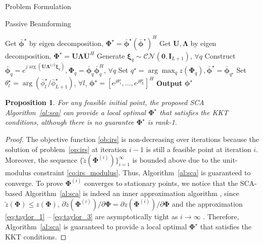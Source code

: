 \documentclass[journal]{IEEEtran}
\newtheorem{proposition}{Proposition}
\begin{document}
\begin{section}{Problem Formulation}
\begin{subsection}{Passive Beamforming}
\begin{algorithm}[!t]
\begin{algorithmic}[1]
						\State Get $\bar{\boldsymbol{\phi}}^\star$ by eigen decomposition, $\boldsymbol{\Phi}^{\star}=\bar{\boldsymbol{\phi}}^\star(\bar{\boldsymbol{\phi}}^\star)^H$
					\Else
						\State Get $\boldsymbol{U},\boldsymbol{\Lambda}$ by eigen decomposition, $\boldsymbol{\Phi}^{\star}=\boldsymbol{U}\boldsymbol{\Lambda}\boldsymbol{U}^H$
						\State Generate $\boldsymbol{\xi}_q \sim \mathcal{CN}(\boldsymbol{0},\boldsymbol{I}_{L+1})$, $\forall q$
						\State Construct $\bar{\boldsymbol{\phi}}_q=e^{j\arg\left(\boldsymbol{U}\boldsymbol{\Lambda}^{1/2}\boldsymbol{\xi}_q\right)},\boldsymbol{\Phi}_q=\bar{\boldsymbol{\phi}}_q\bar{\boldsymbol{\phi}}_q^H$, $\forall q$
						\State Set $q^{\star}=\arg\max_q{z(\boldsymbol{\Phi}_q)},\bar{\boldsymbol{\phi}}^\star=\bar{\boldsymbol{\phi}}_{q^{\star}}$
					\EndIf
					\State Set $\theta_l^\star=\arg(\bar{\phi}_l^\star/\bar{\phi}_{L+1}^\star)$, $\forall l$, $\boldsymbol{\phi}^{\star}=[e^{j\theta_1^\star},\dots,e^{j\theta_L^\star}]^H$
					\State \textbf{Output} $\boldsymbol{\phi}^{\star}$
				\end{algorithmic}
			\end{algorithm}

			\begin{proposition}\label{pr:sca}
				For any feasible initial point, the proposed SCA Algorithm~\ref{al:sca} can provide a local optimal $\boldsymbol{\Phi}^{\star}$ that satisfies the KKT conditions, although there is no guarantee $\boldsymbol{\Phi}^{\star}$ is rank-\num{1}.
			\end{proposition}

			\begin{proof}\label{pf:sca}
				The objective function \eqref{ob:irs} is non-decreasing over iterations because the solution of problem~\eqref{op:irs} at iteration $i-1$ is still a feasible point at iteration $i$. Moreover, the sequence $\{\tilde{z}(\boldsymbol{\Phi}^{(i)})\}_{i=1}^{\infty}$ is bounded above due to the unit-modulus constraint \eqref{co:irs_modulus}. Thus, Algorithm~\ref{al:sca} is guaranteed to converge. To prove $\boldsymbol{\Phi}^{(i)}$ converges to stationary points, we notice that the SCA-based Algorithm~\ref{al:sca} is indeed an inner approximation algorithm \cite{Marks1978}, since $\tilde{z}(\boldsymbol{\Phi}) \le z(\boldsymbol{\Phi})$, $\partial\tilde{z}(\boldsymbol{\Phi}^{(i)})/\partial\boldsymbol{\Phi}=\partial z(\boldsymbol{\Phi}^{(i)})/\partial\boldsymbol{\Phi}$ and the approximation \eqref{eq:taylor_1} -- \eqref{eq:taylor_3} are asymptotically tight as $i \to \infty$ \cite{Li2013}. Therefore, Algorithm~\ref{al:sca} is guaranteed to provide a local optimal $\boldsymbol{\Phi}^{\star}$ that satisfies the KKT conditions.
			\end{proof}
		\end{subsection}


\end{section}
\end{document}
